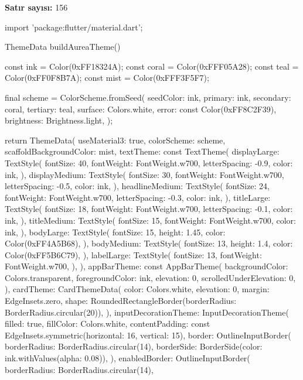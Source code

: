 \documentclass[11pt,a4paper]{article}
\begin{document}
\textbf{Satır sayısı:} 156

\begin{codeblock}
import 'package:flutter/material.dart';

ThemeData buildAureaTheme() {
  const ink = Color(0xFF18324A);
  const coral = Color(0xFFF05A28);
  const teal = Color(0xFF0F8B7A);
  const mist = Color(0xFFF3F5F7);

  final scheme = ColorScheme.fromSeed(
    seedColor: ink,
    primary: ink,
    secondary: coral,
    tertiary: teal,
    surface: Colors.white,
    error: const Color(0xFF8C2F39),
    brightness: Brightness.light,
  );

  return ThemeData(
    useMaterial3: true,
    colorScheme: scheme,
    scaffoldBackgroundColor: mist,
    textTheme: const TextTheme(
      displayLarge: TextStyle(
        fontSize: 40,
        fontWeight: FontWeight.w700,
        letterSpacing: -0.9,
        color: ink,
      ),
      displayMedium: TextStyle(
        fontSize: 30,
        fontWeight: FontWeight.w700,
        letterSpacing: -0.5,
        color: ink,
      ),
      headlineMedium: TextStyle(
        fontSize: 24,
        fontWeight: FontWeight.w700,
        letterSpacing: -0.3,
        color: ink,
      ),
      titleLarge: TextStyle(
        fontSize: 18,
        fontWeight: FontWeight.w700,
        letterSpacing: -0.1,
        color: ink,
      ),
      titleMedium: TextStyle(
        fontSize: 15,
        fontWeight: FontWeight.w700,
        color: ink,
      ),
      bodyLarge: TextStyle(
        fontSize: 15,
        height: 1.45,
        color: Color(0xFF4A5B68),
      ),
      bodyMedium: TextStyle(
        fontSize: 13,
        height: 1.4,
        color: Color(0xFF5B6C79),
      ),
      labelLarge: TextStyle(
        fontSize: 13,
        fontWeight: FontWeight.w700,
      ),
    ),
    appBarTheme: const AppBarTheme(
      backgroundColor: Colors.transparent,
      foregroundColor: ink,
      elevation: 0,
      scrolledUnderElevation: 0,
    ),
    cardTheme: CardThemeData(
      color: Colors.white,
      elevation: 0,
      margin: EdgeInsets.zero,
      shape: RoundedRectangleBorder(borderRadius: BorderRadius.circular(20)),
    ),
    inputDecorationTheme: InputDecorationTheme(
      filled: true,
      fillColor: Colors.white,
      contentPadding: const EdgeInsets.symmetric(horizontal: 16, vertical: 15),
      border: OutlineInputBorder(
        borderRadius: BorderRadius.circular(14),
        borderSide: BorderSide(color: ink.withValues(alpha: 0.08)),
      ),
      enabledBorder: OutlineInputBorder(
        borderRadius: BorderRadius.circular(14),
}
\end{codeblock}
\end{document}
